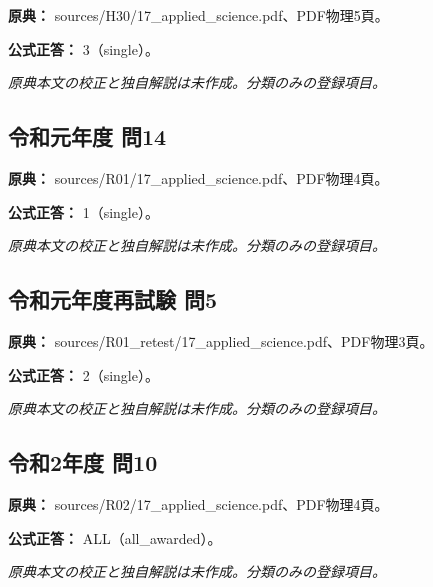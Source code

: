 \noindent\textbf{原典：} sources/H30/17\_applied\_science.pdf、PDF物理5頁。

\textbf{公式正答：} 3（single）。

\par\textit{原典本文の校正と独自解説は未作成。分類のみの登録項目。}

\subsection{令和元年度 問14}
\label{q:r01-reg-applied-14}

\noindent\textbf{原典：} sources/R01/17\_applied\_science.pdf、PDF物理4頁。

\textbf{公式正答：} 1（single）。

\par\textit{原典本文の校正と独自解説は未作成。分類のみの登録項目。}

\subsection{令和元年度再試験 問5}
\label{q:r01-ret-applied-05}

\noindent\textbf{原典：} sources/R01\_retest/17\_applied\_science.pdf、PDF物理3頁。

\textbf{公式正答：} 2（single）。

\par\textit{原典本文の校正と独自解説は未作成。分類のみの登録項目。}

\subsection{令和2年度 問10}
\label{q:r02-reg-applied-10}

\noindent\textbf{原典：} sources/R02/17\_applied\_science.pdf、PDF物理4頁。

\textbf{公式正答：} ALL（all\_awarded）。

\par\textit{原典本文の校正と独自解説は未作成。分類のみの登録項目。}
